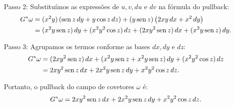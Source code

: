 {	Passo 2: Substituímos as expressões de $u, v, du$ e $dv$ na fórmula do pullback:
	\begin{align*}
		G^* \omega &= (x^2y) \left( \operatorname{sen} z \, dy + y \cos z \, dz \right) + (y \operatorname{sen} z) \left( 2xy \, dx + x^2 \, dy \right) \\
		&= (x^2y \operatorname{sen} z) \, dy + (x^2y^2 \cos z) \, dz + (2xy^2 \operatorname{sen} z) \, dx + (x^2y \operatorname{sen} z) \, dy.
	\end{align*}
	
	Passo 3: Agrupamos os termos conforme as bases $dx, dy$ e $dz$:
	\begin{align*}
		G^* \omega &= (2xy^2 \operatorname{sen} z) \, dx + (x^2y \operatorname{sen} z + x^2y \operatorname{sen} z) \, dy + (x^2y^2 \cos z) \, dz \\
		&= 2xy^2 \operatorname{sen} z \, dx + 2x^2y \operatorname{sen} z \, dy + x^2y^2 \cos z \, dz.
	\end{align*}
	
	Portanto, o pullback do campo de covetores $\omega$ é:
	\begin{equation*}
		G^* \omega = 2xy^2 \operatorname{sen} z \, dx + 2x^2y \operatorname{sen} z \, dy + x^2y^2 \cos z \, dz.
	\end{equation*}
}


